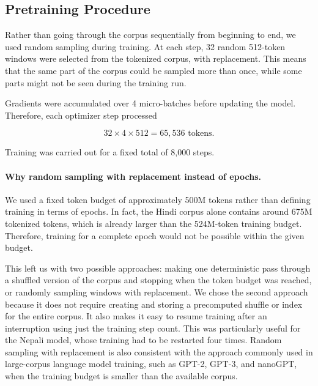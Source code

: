\documentclass[10pt,a4paper]{article}
\begin{document}
\subsection{Pretraining Procedure}
Rather than going through the corpus sequentially from beginning to end,
we used random sampling during training. At each step, 32 random
512-token windows were selected from the tokenized corpus, with
replacement. This means that the same part of the corpus could be sampled
more than once, while some parts might not be seen during the training run.

Gradients were accumulated over 4 micro-batches before updating the model.
Therefore, each optimizer step processed

\[
32 \times 4 \times 512 = 65{,}536 \text{ tokens}.
\]

Training was carried out for a fixed total of 8,000 steps.

\paragraph{Why random sampling with replacement instead of epochs.}
We used a fixed token budget of approximately 500M tokens rather than
defining training in terms of epochs. In fact, the Hindi corpus alone
contains around 675M tokenized tokens, which is already larger than the
524M-token training budget. Therefore, training for a complete epoch would
not be possible within the given budget.

This left us with two possible approaches: making one deterministic pass
through a shuffled version of the corpus and stopping when the token budget
was reached, or randomly sampling windows with replacement. We chose the
second approach because it does not require creating and storing a
precomputed shuffle or index for the entire corpus. It also makes it easy
to resume training after an interruption using just the training step
count. This was particularly useful for the Nepali model, whose training
had to be restarted four times. Random sampling with replacement is also
consistent with the approach commonly used in large-corpus language model
training, such as GPT-2, GPT-3, and nanoGPT, when the training budget is
smaller than the available corpus.
\end{document}
